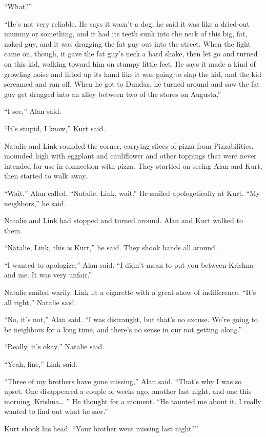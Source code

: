 ``What?''

``He's not very reliable.  He says it wasn't a dog, he said it was
like a dried-out mummy or something, and it had its teeth sunk into
the neck of this big, fat, naked guy, and it was dragging the fat guy
out into the street.  When the light came on, though, it gave the fat
guy's neck a hard shake, then let go and turned on this kid, walking
toward him on stumpy little feet.  He says it made a kind of growling
noise and lifted up its hand like it was going to slap the kid, and
the kid screamed and ran off.  When he got to Dundas, he turned around
and saw the fat guy get dragged into an alley between two of the
stores on Augusta.''

``I see,'' Alan said.

``It's stupid, I know,'' Kurt said.

Natalie and Link rounded the corner, carrying slices of pizza from
Pizzabilities, mounded high with eggplant and cauliflower and other
toppings that were never intended for use in connection with pizza. 
They startled on seeing Alan and Kurt, then started to walk away.

``Wait,'' Alan called.  ``Natalie, Link, wait.'' He smiled
apologetically at Kurt.  ``My neighbors,'' he said.

Natalie and Link had stopped and turned around.  Alan and Kurt walked
to them.

``Natalie, Link, this is Kurt,'' he said.  They shook hands all
around.

``I wanted to apologize,'' Alan said.  ``I didn't mean to put you
between Krishna and me.  It was very unfair.''

Natalie smiled warily.  Link lit a cigarette with a great show of
indifference.  ``It's all right,'' Natalie said.

``No, it's not,'' Alan said.  ``I was distraught, but that's no
excuse.  We're going to be neighbors for a long time, and there's no
sense in our not getting along.''

``Really, it's okay,'' Natalie said.

``Yeah, fine,'' Link said.

``Three of my brothers have gone missing,'' Alan said.  ``That's why I
was so upset.  One disappeared a couple of weeks ago, another last
night, and one this morning.  Krishna\ldots{}  '' He thought for a moment. 
``He taunted me about it.  I really wanted to find out what he saw.''

Kurt shook his head.  ``Your brother went missing last night?''

